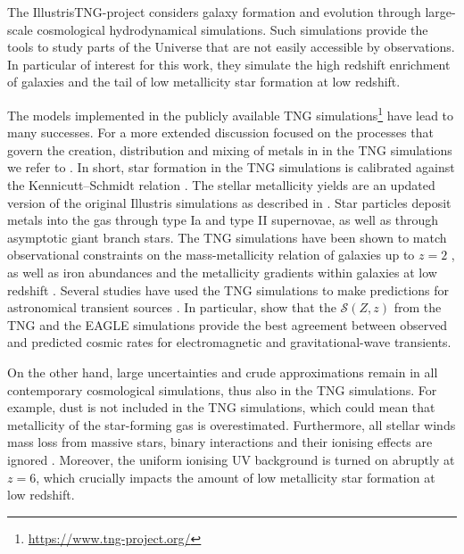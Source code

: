 \documentclass[twocolumn]{aastex631}
\newcommand{\SFRDzZ}{\ensuremath{\mathcal{S}(Z,z)}\xspace}
\begin{document}
The IllustrisTNG-project \citep[or TNG in short,][]{FirstResTNG_Springel2018,FirstResTNG_Marinacci2018, FirstResTNG_Nelson2018,FirstResTNG_Pillepich2018, FirstResTNG_Naiman2018} considers galaxy formation and evolution through large-scale cosmological hydrodynamical simulations.
Such simulations provide the tools to study parts of the Universe that are not easily accessible by observations. In particular of interest for this work, they simulate the high redshift enrichment of galaxies and the tail of low metallicity star formation at low redshift.

The models implemented in the publicly available TNG simulations\footnote{ \url{https://www.tng-project.org/}} have lead to many successes. For a more extended discussion focused on the processes that govern the creation, distribution and mixing of metals in in the TNG simulations we refer to \cite{Pakmor+2022}. In short, star formation in the TNG simulations is calibrated against the Kennicutt–Schmidt relation \citep[][]{Schmidt1959,Kennicutt1989}. The stellar metallicity yields are an updated version of the original Illustris simulations as described in \cite{Pillepich2018}. Star particles deposit metals into the gas through type Ia and type II supernovae, as well as through asymptotic giant branch stars. 
The TNG simulations have been shown to match observational constraints on the mass-metallicity relation of galaxies up to $z = 2$ \citep{Torrey+2019}, as well as iron abundances \citep{FirstResTNG_Naiman2018} and the metallicity gradients within galaxies at low redshift \citep{Hemler+2021}. %
Several studies have used the TNG simulations to make predictions for astronomical transient sources \citep[e.g.][]{Briel+2021,Bavera+2022,vanson+2022}. In particular, \cite{Briel+2021} show that the \SFRDzZ from the TNG and the EAGLE \citep{Schaye+2015,Crain+2015} simulations provide the best agreement between observed and predicted cosmic rates for electromagnetic and gravitational-wave transients. 

On the other hand, large uncertainties and crude approximations remain in all contemporary cosmological simulations, thus also in the TNG simulations. For example, dust is not included in the TNG simulations, which could mean that metallicity of the star-forming gas is overestimated. Furthermore, all stellar winds mass loss from massive stars, binary interactions and their ionising effects are ignored \citep[e.g.][]{Dray+2003,Smith2014,Gotberg+2020,DoughtyFinlator2021,Farmer2021_carbonfootprint,Goswami+2022}.
Moreover, the uniform ionising UV background is turned on abruptly at $z=6$, which crucially impacts the amount of low metallicity star formation at low redshift.
\end{document}
